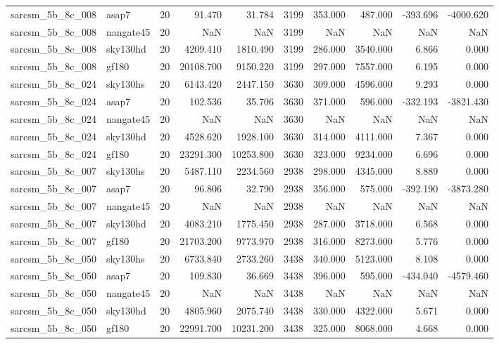\begin{longtable}{llrrrrrrrr}
sarcsm\_5b\_8c\_008 & asap7 & 20 & 91.470 & 31.784 & 3199 & 353.000 & 487.000 & -393.696 & -4000.620 \\
sarcsm\_5b\_8c\_008 & nangate45 & 20 & NaN & NaN & 3199 & NaN & NaN & NaN & NaN \\
sarcsm\_5b\_8c\_008 & sky130hd & 20 & 4209.410 & 1810.490 & 3199 & 286.000 & 3540.000 & 6.866 & 0.000 \\
sarcsm\_5b\_8c\_008 & gf180 & 20 & 20108.700 & 9150.220 & 3199 & 297.000 & 7557.000 & 6.195 & 0.000 \\
sarcsm\_5b\_8c\_024 & sky130hs & 20 & 6143.420 & 2447.150 & 3630 & 309.000 & 4596.000 & 9.293 & 0.000 \\
sarcsm\_5b\_8c\_024 & asap7 & 20 & 102.536 & 35.706 & 3630 & 371.000 & 596.000 & -332.193 & -3821.430 \\
sarcsm\_5b\_8c\_024 & nangate45 & 20 & NaN & NaN & 3630 & NaN & NaN & NaN & NaN \\
sarcsm\_5b\_8c\_024 & sky130hd & 20 & 4528.620 & 1928.100 & 3630 & 314.000 & 4111.000 & 7.367 & 0.000 \\
sarcsm\_5b\_8c\_024 & gf180 & 20 & 23291.300 & 10253.800 & 3630 & 323.000 & 9234.000 & 6.696 & 0.000 \\
sarcsm\_5b\_8c\_007 & sky130hs & 20 & 5487.110 & 2234.560 & 2938 & 298.000 & 4345.000 & 8.889 & 0.000 \\
sarcsm\_5b\_8c\_007 & asap7 & 20 & 96.806 & 32.790 & 2938 & 356.000 & 575.000 & -392.190 & -3873.280 \\
sarcsm\_5b\_8c\_007 & nangate45 & 20 & NaN & NaN & 2938 & NaN & NaN & NaN & NaN \\
sarcsm\_5b\_8c\_007 & sky130hd & 20 & 4083.210 & 1775.450 & 2938 & 287.000 & 3718.000 & 6.568 & 0.000 \\
sarcsm\_5b\_8c\_007 & gf180 & 20 & 21703.200 & 9773.970 & 2938 & 316.000 & 8273.000 & 5.776 & 0.000 \\
sarcsm\_5b\_8c\_050 & sky130hs & 20 & 6733.840 & 2733.260 & 3438 & 340.000 & 5123.000 & 8.108 & 0.000 \\
sarcsm\_5b\_8c\_050 & asap7 & 20 & 109.830 & 36.669 & 3438 & 396.000 & 595.000 & -434.040 & -4579.460 \\
sarcsm\_5b\_8c\_050 & nangate45 & 20 & NaN & NaN & 3438 & NaN & NaN & NaN & NaN \\
sarcsm\_5b\_8c\_050 & sky130hd & 20 & 4805.960 & 2075.740 & 3438 & 330.000 & 4322.000 & 5.671 & 0.000 \\
sarcsm\_5b\_8c\_050 & gf180 & 20 & 22991.700 & 10231.200 & 3438 & 325.000 & 8068.000 & 4.668 & 0.000 \\

\end{longtable}
